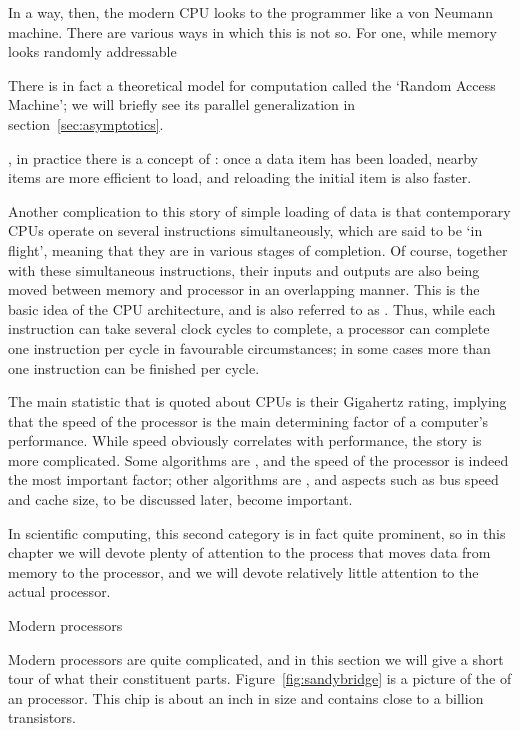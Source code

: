In a way, then, the modern \ac{CPU} looks to the programmer like a von
Neumann machine. There are various ways in which this is not so. For
one, while memory looks randomly addressable
\begin{footnoteenv}
  {There is in fact
  a theoretical model for computation called the `Random Access
  Machine'; we will briefly see its parallel generalization in
  section~\ref{sec:asymptotics}.}
\end{footnoteenv}%
, in practice there is a concept of
: once a data item has been loaded, nearby items
are more efficient to load, and reloading the initial item is also faster.

Another complication to this story of simple loading of data is that
contemporary \acp{CPU} operate on several
instructions simultaneously, which are said to be `in flight', meaning
that they are in various stages of completion. 
Of course, together with these simultaneous instructions, their inputs
and outputs are also being moved between memory and processor in an
overlapping manner.
This is the basic idea
of the  \ac{CPU} architecture, and is also referred
to as . Thus, while each
instruction can take several clock cycles to complete, a processor can
complete one instruction per cycle in favourable circumstances; in
some cases more than one instruction can be finished per cycle.
 
The main statistic that is quoted about \acp{CPU} is their 
Gigahertz rating, implying that the speed of the processor is the main
determining factor of a computer's performance. While speed obviously
correlates with performance, the story is more complicated. Some
algorithms are , and the speed of the processor
is indeed the most important factor; other algorithms are
, and aspects such as bus speed and cache
size, to be discussed later,
become important.

In scientific computing, this second category is in fact quite
prominent, so in this chapter we will devote plenty of attention to
the process that moves data from memory to the processor, and we will
devote relatively little attention to the actual processor.

 {Modern processors}
\label{sec:fp}

Modern processors are quite complicated, and in this section we will
give a short tour of what their constituent parts.
Figure~\ref{fig:sandybridge} is a picture of the 
of an  processor.
This chip is about an inch in size and contains close
to a billion transistors.

